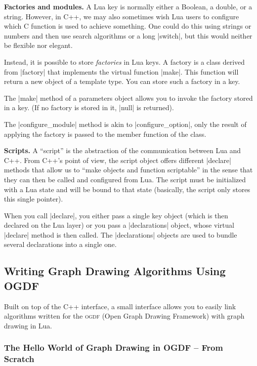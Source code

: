 \medskip
\noindent\textbf{Factories and modules.}
A Lua key is normally either a Boolean, a double, or a string. However, in C++,
we may also sometimes wish Lua users to configure which C function is used to
achieve something. One could do this using strings or numbers and then use
search algorithms or a long |switch|, but this would neither be flexible nor
elegant.

Instead, it is possible to store \emph{factories} in Lua keys. A factory is a
class derived from |factory| that implements the virtual function |make|. This
function will return a new object of a template type. You can store such a
factory in a key.

The |make| method of a parameters object allows you to invoke the factory
stored in a key. (If no factory is stored in it, |null| is returned).

The |configure_module| method is akin to |configure_option|, only the result of
applying the factory is passed to the member function of the class.


\medskip
\noindent\textbf{Scripts.}
A ``script'' is the abstraction of the communication between Lua and C++. From
C++'s point of view, the script object offers different |declare| methods that
allow us to ``make objects and function scriptable'' in the sense that they can
then be called and configured from Lua. The script must be initialized with a
Lua state and will be bound to that state (basically, the script only stores
this single pointer).

When you call |declare|, you either pass a single key object (which is then
declared on the Lua layer) or you pass a |declarations| object, whose virtual
|declare| method is then called. The |declarations| objects are used to bundle
several declarations into a single one.


\subsection{Writing Graph Drawing Algorithms Using OGDF}
\label{section-gd-ogdf-interface}

Built on top of the C++ interface, a small interface allows you to easily link
algorithms written for the \textsc{ogdf} (Open Graph Drawing Framework) with
graph drawing in Lua.


\subsubsection{The Hello World of Graph Drawing in OGDF -- From Scratch}

